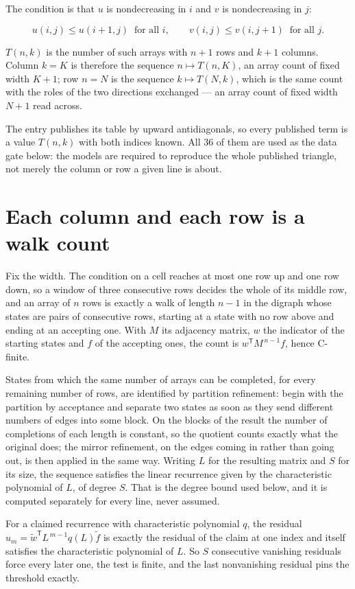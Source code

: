 \documentclass[11pt]{article}
\theoremstyle{definition}
\begin{document}
The condition is that $u$ is nondecreasing in $i$ and $v$ is nondecreasing in $j$:

\[u(i,j) \le u(i{+}1,j) \ \text{ for all } i, \qquad v(i,j) \le v(i,j{+}1) \ \text{ for all } j.\]

$T(n,k)$ is the number of such arrays with $n + 1$ rows and $k + 1$ columns. Column $k = K$ is therefore the sequence $n \mapsto T(n,K)$, an array count of fixed width $K + 1$; row $n = N$ is the sequence $k \mapsto T(N,k)$, which is the same count with the roles of the two directions exchanged --- an array count of fixed width $N + 1$ read across.

The entry publishes its table by upward antidiagonals, so every published term is a value $T(n,k)$ with both indices known. All 36 of them are used as the data gate below: the models are required to reproduce the whole published triangle, not merely the column or row a given line is about.

\section{Each column and each row is a walk count}

Fix the width. The condition on a cell reaches at most one row up and one row down, so a window of three consecutive rows decides the whole of its middle row, and an array of $n$ rows is exactly a walk of length $n-1$ in the digraph whose states are pairs of consecutive rows, starting at a state with no row above and ending at an accepting one. With $M$ its adjacency matrix, $w$ the indicator of the starting states and $f$ of the accepting ones, the count is $w^{\mathsf T}M^{\,n-1}f$, hence C-finite.

States from which the same number of arrays can be completed, for every remaining number of rows, are identified by partition refinement: begin with the partition by acceptance and separate two states as soon as they send different numbers of edges into some block. On the blocks of the result the number of completions of each length is constant, so the quotient counts exactly what the original does; the mirror refinement, on the edges coming in rather than going out, is then applied in the same way. Writing $L$ for the resulting matrix and $S$ for its size, the sequence satisfies the linear recurrence given by the characteristic polynomial of $L$, of degree $S$. That is the degree bound used below, and it is computed separately for every line, never assumed.

For a claimed recurrence with characteristic polynomial $q$, the residual $u_m = \tilde w^{\mathsf T}L^{\,m-1}q(L)\tilde f$ is exactly the residual of the claim at one index and itself satisfies the characteristic polynomial of $L$. So $S$ consecutive vanishing residuals force every later one, the test is finite, and the last nonvanishing residual pins the threshold exactly.
\end{document}
